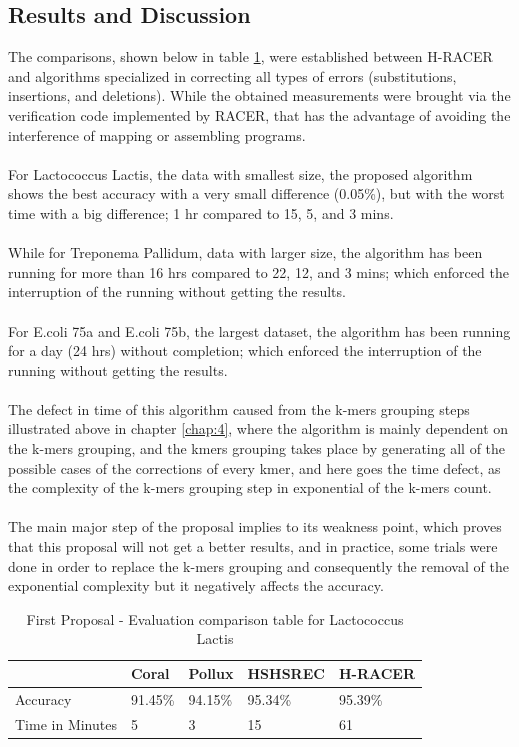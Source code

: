 \documentclass[12pt]{llncs}
\newcommand{\TBstrut}{{\rule{0pt}{7ex}}{\rule[2ex]{0pt}{0pt}}} %
\begin{document}
\subsection{Results and Discussion}
The comparisons, shown below in table \ref{tab:eval1-1}, were established between H-RACER and algorithms specialized in correcting all types of errors (substitutions, insertions, and deletions). While the obtained measurements were brought via the verification code implemented by RACER, that has the advantage of avoiding the interference of mapping or assembling programs. 
\\\\
For Lactococcus Lactis, the data with smallest size, the proposed algorithm shows the best accuracy with a very small difference (0.05\%), but with the worst time with a big difference; 1 hr compared to 15, 5, and 3 mins.
\\
\\
While for Treponema Pallidum, data with larger size, the algorithm has been running for more than 16 hrs compared to 22, 12, and 3 mins; which enforced the interruption of the running without getting the results.
\\
\\
For E.coli 75a and E.coli 75b, the largest dataset, the algorithm has been running for a day (24 hrs) without completion; which enforced the interruption of the running without getting the results.
\\
\\
The defect in time of this algorithm caused from the k-mers grouping steps illustrated above in chapter \ref{chap:4}, where the algorithm is mainly dependent on the k-mers grouping, and the kmers grouping takes place by generating all of the possible cases of the corrections of every kmer, and here goes the time defect, as the complexity of the k-mers grouping step in exponential of the k-mers count.
\\
\\
The main major step of the proposal implies to its weakness point, which proves that this proposal will not get a better results, and in practice, some trials were done in order to replace the k-mers grouping and consequently the removal of the exponential complexity but it negatively affects the accuracy.

\begin{longtable}{|m{33mm}|m{20mm}|m{20mm}|m{20mm}|m{20mm}|}
	    \caption{\label{tab:eval1-1}First Proposal - Evaluation comparison table for Lactococcus Lactis}\\
        \hline
           & Coral & Pollux & HSHSREC & H-RACER\cellcolor{DarkGray} \TBstrut\\ %
        \hline
           Accuracy & 91.45\% & 94.15\% & 95.34\% & 95.39\%\cellcolor{LightGray} \TBstrut\\ %
        \hline
           Time in Minutes& 5 & 3 & 15 & 61\cellcolor{LightGray} \TBstrut\\ %
        \hline
\end{longtable}
\end{document}
